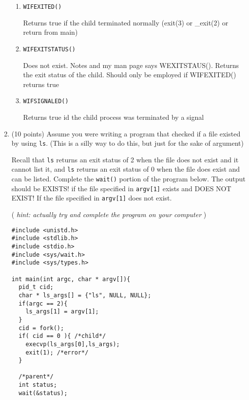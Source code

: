 \documentclass{article}[9pt]
\newenvironment{answerfont}{\fontfamily{qhv}\selectfont}{\par}
\newenvironment{myanswer}{\begin{mdframed}\begin{answerfont}}{\end{answerfont}\end{mdframed}}
\begin{document}
\begin{enumerate}
\begin{enumerate}
\item \texttt{WIFEXITED()}

  \begin{myanswer}
    Returns true if the child terminated normally (exit(3) or \_exit(2)
    or return from main)
  \end{myanswer}

\item \texttt{WIFEXITSTATUS()}

  \begin{myanswer}
    Does not exist.  Notes and my man page says WEXITSTAUS().  Returns
    the exit status of the child. Should only be employed if WIFEXITED()
    returns true
  \end{myanswer}

\item \texttt{WIFSIGNALED()}

  \begin{myanswer}
    Returns true id the child process was terminated by a signal
  \end{myanswer}

\end{enumerate}

\item (10 points) Assume you were writing a program that checked if a file
existed by using \texttt{ls}. (This is a silly way to do this, but just
for the sake of argument)

Recall that \texttt{ls} returns an exit status of 2 when the file does
not exist and it cannot list it, and \texttt{ls} returns an exit status
of 0 when the file does exist and can be listed. Complete the
\texttt{wait()} portion of the program below. The output should be
EXISTS! if the file specified in \texttt{argv[1]} exists and DOES NOT
EXIST! If the file specified in \texttt{argv[1]} does not exist. 

( \emph{hint: actually try and complete the program on your computer} )

\begin{verbatim}
#include <unistd.h>
#include <stdlib.h>
#include <stdio.h>
#include <sys/wait.h>
#include <sys/types.h>

int main(int argc, char * argv[]){
  pid_t cid;
  char * ls_args[] = {"ls", NULL, NULL};
  if(argc == 2){
    ls_args[1] = argv[1];
  }
  cid = fork();
  if( cid == 0 ){ /*child*/
    execvp(ls_args[0],ls_args);
    exit(1); /*error*/
  }

  /*parent*/
  int status;
  wait(&status);


\end{verbatim}
\end{enumerate}
\end{document}
